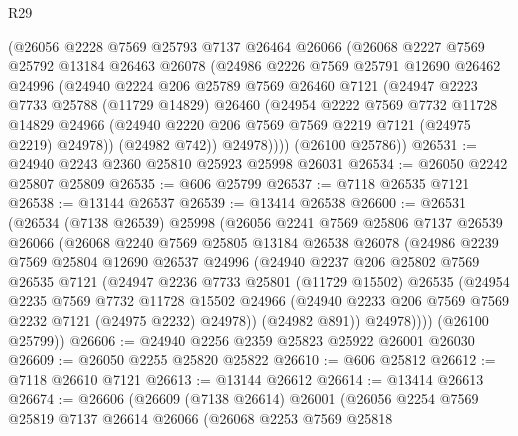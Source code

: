 \begin{lexlean}{R29}
\begin{coremodule}
      (@26056
        @2228
        @7569
        @25793
        @7137
        @26464
        @26066
        (@26068
          @2227
          @7569
          @25792
          @13184
          @26463
          @26078
          (@24986
            @2226
            @7569
            @25791
            @12690
            @26462
            @24996
            (@24940
              @2224
              @206
              @25789
              @7569
              @26460
              @7121
              (@24947
                @2223
                @7733
                @25788
                (@11729 @14829)
                @26460
                (@24954
                  @2222
                  @7569
                  @7732
                  @11728
                  @14829
                  @24966
                  (@24940 @2220 @206 @7569 @7569 @2219 @7121 (@24975 @2219) @24978))
                (@24982 @742))
              @24978))))
      (@26100 @25786))
@26531 := @24940 @2243 @2360 @25810 @25923 @25998 @26031
@26534 := @26050 @2242 @25807 @25809
@26535 := @606 @25799
@26537 := @7118 @26535 @7121
@26538 := @13144 @26537
@26539 := @13414 @26538
@26600 := @26531
    (@26534
      (@7138 @26539)
      @25998
      (@26056
        @2241
        @7569
        @25806
        @7137
        @26539
        @26066
        (@26068
          @2240
          @7569
          @25805
          @13184
          @26538
          @26078
          (@24986
            @2239
            @7569
            @25804
            @12690
            @26537
            @24996
            (@24940
              @2237
              @206
              @25802
              @7569
              @26535
              @7121
              (@24947
                @2236
                @7733
                @25801
                (@11729 @15502)
                @26535
                (@24954
                  @2235
                  @7569
                  @7732
                  @11728
                  @15502
                  @24966
                  (@24940 @2233 @206 @7569 @7569 @2232 @7121 (@24975 @2232) @24978))
                (@24982 @891))
              @24978))))
      (@26100 @25799))
@26606 := @24940 @2256 @2359 @25823 @25922 @26001 @26030
@26609 := @26050 @2255 @25820 @25822
@26610 := @606 @25812
@26612 := @7118 @26610 @7121
@26613 := @13144 @26612
@26614 := @13414 @26613
@26674 := @26606
    (@26609
      (@7138 @26614)
      @26001
      (@26056
        @2254
        @7569
        @25819
        @7137
        @26614
        @26066
        (@26068
          @2253
          @7569
          @25818

\end{coremodule}
\end{lexlean}
